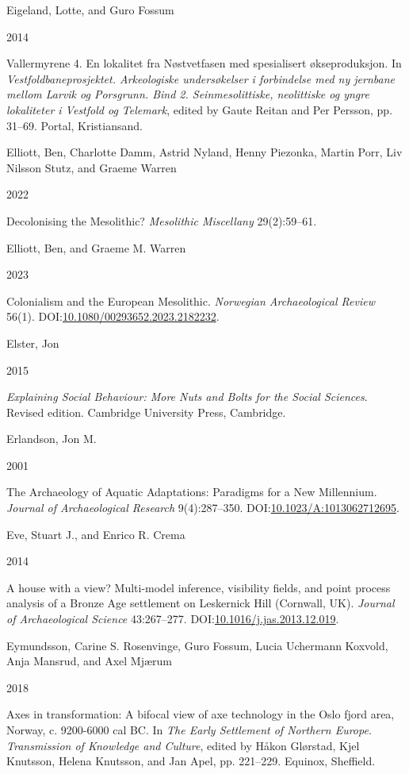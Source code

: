\documentclass[
  a4paper,
  oneside]{uiophdthesis}
\newlength{\cslhangindent}
\newlength{\csllabelwidth}
\newlength{\cslentryspacingunit} %
\newenvironment{CSLReferences}[2] %
 {%
  \setlength{\parindent}{0pt}
  \ifodd #1
  \let\oldpar\par
  \def\par{\hangindent=\cslhangindent\oldpar}
  \fi
  \setlength{\parskip}{#2\cslentryspacingunit}
 }%
 {}
\newcommand{\CSLBlock}[1]{#1\hfill\break}
\newcommand{\CSLLeftMargin}[1]{\parbox[t]{\csllabelwidth}{#1}}
\newcommand{\CSLRightInline}[1]{\parbox[t]{\linewidth - \csllabelwidth}{#1}\break}
\begin{document}
\begin{CSLReferences}{0}{0}
\leavevmode{}%
\CSLBlock{Eigeland, Lotte, and Guro Fossum}
\CSLLeftMargin{ 2014}
\CSLRightInline{{Vallermyrene 4. En lokalitet fra Nøstvetfasen med spesialisert økseproduksjon}. In \emph{{Vestfoldbaneprosjektet. Arkeologiske undersøkelser i forbindelse med ny jernbane mellom Larvik og Porsgrunn. Bind 2. Seinmesolittiske, neolittiske og yngre lokaliteter i Vestfold og Telemark}}, edited by Gaute Reitan and Per Persson, pp. 31--69. Portal, Kristiansand.}

\leavevmode{}%
\CSLBlock{Elliott, Ben, Charlotte Damm, Astrid Nyland, Henny Piezonka, Martin Porr, Liv Nilsson Stutz, and Graeme Warren}
\CSLLeftMargin{ 2022}
\CSLRightInline{{Decolonising the Mesolithic?} \emph{Mesolithic Miscellany} 29(2):59--61.}

\leavevmode{}%
\CSLBlock{Elliott, Ben, and Graeme M. Warren}
\CSLLeftMargin{ 2023}
\CSLRightInline{{Colonialism and the European Mesolithic}. \emph{Norwegian Archaeological Review} 56(1). DOI:\href{https://doi.org/10.1080/00293652.2023.2182232}{10.1080/00293652.2023.2182232}.}

\leavevmode{}%
\CSLBlock{Elster, Jon}
\CSLLeftMargin{ 2015}
\CSLRightInline{\emph{{Explaining Social Behaviour: More Nuts and Bolts for the Social Sciences}}. Revised edition. Cambridge University Press, Cambridge.}

\leavevmode{}%
\CSLBlock{Erlandson, Jon M.}
\CSLLeftMargin{ 2001}
\CSLRightInline{{The Archaeology of Aquatic Adaptations: Paradigms for a New Millennium}. \emph{Journal of Archaeological Research} 9(4):287--350. DOI:\href{https://doi.org/10.1023/A:1013062712695}{10.1023/A:1013062712695}.}

\leavevmode{}%
\CSLBlock{Eve, Stuart J., and Enrico R. Crema}
\CSLLeftMargin{ 2014}
\CSLRightInline{{A house with a view? Multi-model inference, visibility fields, and point process analysis of a Bronze Age settlement on Leskernick Hill (Cornwall, UK)}. \emph{Journal of Archaeological Science} 43:267--277. DOI:\href{https://doi.org/10.1016/j.jas.2013.12.019}{10.1016/j.jas.2013.12.019}.}

\leavevmode{}%
\CSLBlock{Eymundsson, Carine S. Rosenvinge, Guro Fossum, Lucia Uchermann Koxvold, Anja Mansrud, and Axel Mjærum}
\CSLLeftMargin{ 2018}
\CSLRightInline{{Axes in transformation: A bifocal view of axe technology in the Oslo fjord area, Norway, c. 9200-6000 cal BC}. In \emph{{The Early Settlement of Northern Europe. Transmission of Knowledge and Culture}}, edited by Håkon Glørstad, Kjel Knutsson, Helena Knutsson, and Jan Apel, pp. 221--229. Equinox, Sheffield.}


\end{CSLReferences}
\end{document}
